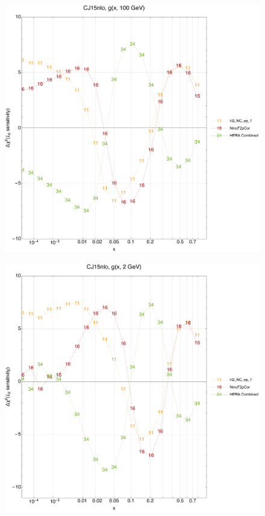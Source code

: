 \documentclass[10pt,aps,prd,floatfix,titlepage]{revtex4}
\begin{document}
\clearpage
\begin{figure}
\includegraphics[width=\textwidth,height=0.44\textheight,keepaspectratio]{1/ifl0_CJ15nlo_L2_q100_Sf_1.pdf}
\caption{}
\end{figure}
\begin{figure}
\includegraphics[width=\textwidth,height=0.44\textheight,keepaspectratio]{1/ifl0_CJ15nlo_L2_q2_Sf_1.pdf}
\caption{}
\end{figure}
\end{document}
